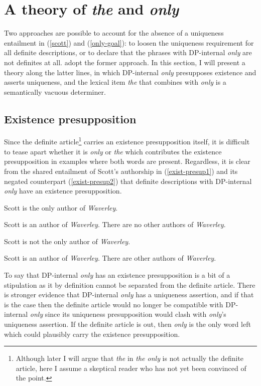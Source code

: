 \section{A theory of \textit{the} and \textit{only} \label{sec:my-theory}}
Two approaches are possible to account for the absence of a uniqueness entailment in (\ref{scott}) and (\ref{only-goal}): to loosen the uniqueness requirement for all definite descriptions, or to declare that the phrases with DP-internal \textit{only} are not definites at all. \citeauthor{cb2015} adopt the former approach. In this section, I will present a theory along the latter lines, in which DP-internal \textit{only} presupposes existence and asserts uniqueness, and the lexical item \textit{the} that combines with \textit{only} is a semantically vacuous determiner.

\subsection{Existence presupposition}
Since the definite article\footnote{Although later I will argue that \textit{the} in \textit{the only} is not actually the definite article, here I assume a skeptical reader who has not yet been convinced of the point.} carries an existence presupposition itself, it is difficult to tease apart whether it is \textit{only} or \textit{the} which contributes the existence presupposition in examples where both words are present. Regardless, it is clear from the shared entailment of Scott's authorship in (\ref{exist-presup1}) and its negated counterpart (\ref{exist-presup2}) that definite descriptions with DP-internal \textit{only} have an existence presupposition.

\begin{exe}
	\ex \label{exist-presup1} Scott is the only author of \textit{Waverley}.
		\begin{xlist}
			\ex Scott is an author of \textit{Waverley}.
			\ex There are no other authors of \textit{Waverley}.
		\end{xlist}
	\ex \label{exist-presup2} Scott is not the only author of \textit{Waverley}.
		\begin{xlist}
			\ex Scott is an author of \textit{Waverley}.
			\ex There are other authors of \textit{Waverley}.
		\end{xlist}
\end{exe}

To say that DP-internal \textit{only} has an existence presupposition is a bit of a stipulation as it by definition cannot be separated from the definite article. There is stronger evidence that DP-internal \textit{only} has a uniqueness assertion, and if that is the case then the definite article would no longer be compatible with DP-internal \textit{only} since its uniqueness presupposition would clash with \textit{only}'s uniqueness assertion. If the definite article is out, then \textit{only} is the only word left which could plausibly carry the existence presupposition.

